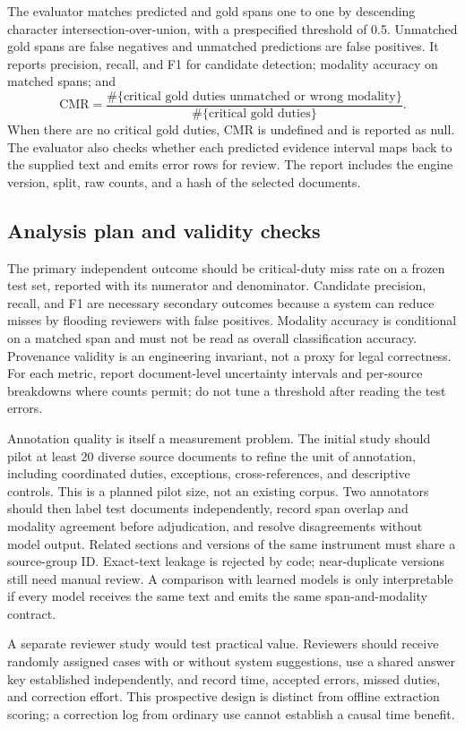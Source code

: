 \documentclass[11pt,a4paper]{article}
\begin{document}
The evaluator matches predicted and gold spans one to one by descending character intersection-over-union, with a prespecified threshold of 0.5. Unmatched gold spans are false negatives and unmatched predictions are false positives. It reports precision, recall, and F1 for candidate detection; modality accuracy on matched spans; and
\[
\mathrm{CMR}=\frac{\#\{\text{critical gold duties unmatched or wrong modality}\}}
{\#\{\text{critical gold duties}\}}.
\]
When there are no critical gold duties, CMR is undefined and is reported as null. The evaluator also checks whether each predicted evidence interval maps back to the supplied text and emits error rows for review. The report includes the engine version, split, raw counts, and a hash of the selected documents.

\subsection{Analysis plan and validity checks}
The primary independent outcome should be critical-duty miss rate on a frozen test set, reported with its numerator and denominator. Candidate precision, recall, and F1 are necessary secondary outcomes because a system can reduce misses by flooding reviewers with false positives. Modality accuracy is conditional on a matched span and must not be read as overall classification accuracy. Provenance validity is an engineering invariant, not a proxy for legal correctness. For each metric, report document-level uncertainty intervals and per-source breakdowns where counts permit; do not tune a threshold after reading the test errors.

Annotation quality is itself a measurement problem. The initial study should pilot at least 20 diverse source documents to refine the unit of annotation, including coordinated duties, exceptions, cross-references, and descriptive controls. This is a planned pilot size, not an existing corpus. Two annotators should then label test documents independently, record span overlap and modality agreement before adjudication, and resolve disagreements without model output. Related sections and versions of the same instrument must share a source-group ID. Exact-text leakage is rejected by code; near-duplicate versions still need manual review. A comparison with learned models is only interpretable if every model receives the same text and emits the same span-and-modality contract.

A separate reviewer study would test practical value. Reviewers should receive randomly assigned cases with or without system suggestions, use a shared answer key established independently, and record time, accepted errors, missed duties, and correction effort. This prospective design is distinct from offline extraction scoring; a correction log from ordinary use cannot establish a causal time benefit.
\end{document}
